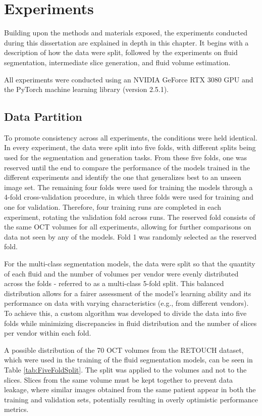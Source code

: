 \chapter{Experiments}\label{Experiments}
Building upon the methods and materials exposed, the experiments conducted during this dissertation are explained in depth in this chapter. It begins with a description of how the data were split, followed by the experiments on fluid segmentation, intermediate slice generation, and fluid volume estimation.
\par
All experiments were conducted using an NVIDIA GeForce RTX 3080 GPU and the \hbox{PyTorch} machine learning library (version 2.5.1).

\section{Data Partition}\label{CrossValidation}
To promote consistency across all experiments, the conditions were held identical. In every experiment, the data were split into five folds, with different splits being used for the segmentation and generation tasks. From these five folds, one was reserved until the end to compare the performance of the models trained in the different experiments and identify the one that generalizes best to an unseen image set. The remaining four folds were used for training the models through a 4-fold cross-validation procedure, in which three folds were used for training and one for validation. Therefore, four training runs are completed in each experiment, rotating the validation fold across runs. The reserved fold consists of the same OCT volumes for all experiments, allowing for further comparisons on data not seen by any of the models. Fold 1 was randomly selected as the reserved fold.
\par
For the multi-class segmentation models, the data were split so that the quantity of each fluid and the number of volumes per vendor were evenly distributed across the folds - referred to as a multi-class 5-fold split. This balanced distribution allows for a fairer assessment of the model's learning ability and its performance on data with varying characteristics (e.g., from different vendors). To achieve this, a custom algorithm was developed to divide the data into five folds while minimizing discrepancies in fluid distribution and the number of slices per vendor within each fold.
\par
A possible distribution of the 70 OCT volumes from the RETOUCH dataset, which were used in the training of the fluid segmentation models, can be seen in Table \ref{tab:FiveFoldSplit}. The split was applied to the volumes and not to the slices. Slices from the same volume must be kept together to prevent data leakage, where similar images obtained from the same patient appear in both the training and validation sets, potentially resulting in overly optimistic performance metrics.

